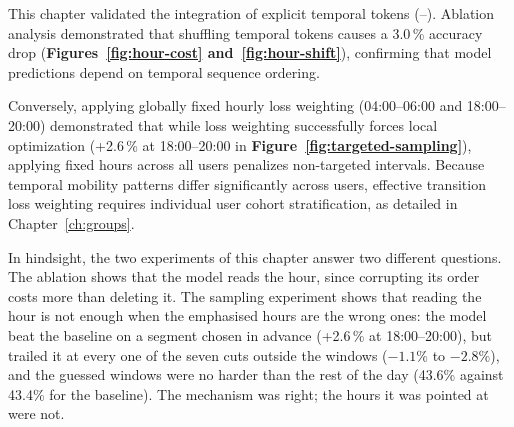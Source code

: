 This chapter validated the integration of explicit temporal tokens (--). Ablation analysis demonstrated that shuffling temporal tokens causes a 3.0\,\% accuracy drop (\textbf{Figures~\ref{fig:hour-cost} and~\ref{fig:hour-shift}}), confirming that model predictions depend on temporal sequence ordering.

Conversely, applying globally fixed hourly loss weighting (04:00--06:00 and 18:00--20:00) demonstrated that while loss weighting successfully forces local optimization (+2.6\,\% at 18:00--20:00 in \textbf{Figure~\ref{fig:targeted-sampling}}), applying fixed hours across all users penalizes non-targeted intervals. Because temporal mobility patterns differ significantly across users, effective transition loss weighting requires individual user cohort stratification, as detailed in Chapter~\ref{ch:groups}.

In hindsight, the two experiments of this chapter answer two different questions. The ablation shows that the model reads the hour, since corrupting its order costs more than deleting it. The sampling experiment shows that reading the hour is not enough when the emphasised hours are the wrong ones: the model beat the baseline on a segment chosen in advance (+2.6\,\% at 18:00--20:00), but trailed it at every one of the seven cuts outside the windows ($-1.1\%$ to $-2.8\%$), and the guessed windows were no harder than the rest of the day (43.6\% against 43.4\% for the baseline). The mechanism was right; the hours it was pointed at were not.
